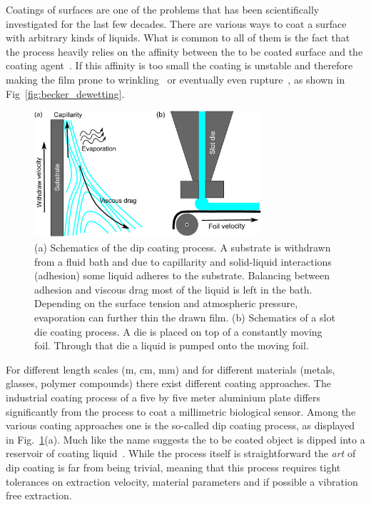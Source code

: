 Coatings of surfaces are one of the problems that has been scientifically investigated for the last few decades.
There are various ways to coat a surface with arbitrary kinds of liquids.
What is common to all of them is the fact that the process heavily relies on the affinity between the to be coated surface and the coating agent~\cite{bonnWettingSpreading2009}.
If this affinity is too small the coating is unstable and therefore making the film prone to wrinkling~\cite{dasilvasobrinhoStudyDefectsUltrathin1999} or eventually even rupture~\cite{oronLongscaleEvolutionThin1997, crasterDynamicsStabilityThin2009, beckerComplexDewettingScenarios2003}, as shown in Fig~\ref{fig:becker_dewetting}.

\begin{figure}
    \centering
    \includegraphics[width=0.75\textwidth]{graphics/Coating_intro.pdf}
    \caption{(a) Schematics of the dip coating process. 
    A substrate is withdrawn from a fluid bath and due to capillarity and solid-liquid interactions (adhesion) some liquid adheres to the substrate.
    Balancing between adhesion and viscous drag most of the liquid is left in the bath.
    Depending on the surface tension and atmospheric pressure, evaporation can further thin the drawn film.
    (b) Schematics of a slot die coating process.
    A die is placed on top of a constantly moving foil.
    Through that die a liquid is pumped onto the moving foil.}
    \label{fig:dip_coating}
\end{figure}
For different length scales (m, cm, mm) and for different materials (metals, glasses, polymer compounds) there exist different coating approaches.
The industrial coating process of a five by five meter aluminium plate differs significantly from the process to coat a millimetric biological sensor.
Among the various coating approaches one is the so-called dip coating process, as displayed in Fig.~\ref{fig:dip_coating}(a). 
Much like the name suggests the to be coated object is dipped into a reservoir of coating liquid~\cite{scrivenPhysicsApplicationsDIP1988, darhuberSelectiveDipcoatingChemically2000, grossoHowExploitFull2011}.
While the process itself is straightforward the \textit{art} of dip coating is far from being trivial, meaning that this process requires tight tolerances on extraction velocity, material parameters and if possible a vibration free extraction.

